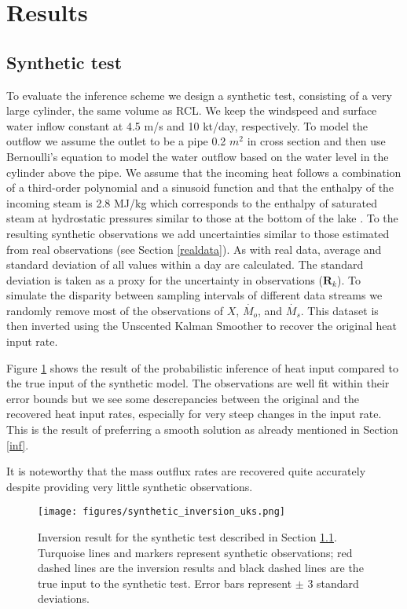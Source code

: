 \documentclass{bmcart}
\newcommand{\bm}[1]{{\textbf{#1}}}
\begin{document}
\section{Results}
\subsection{Synthetic test}\label{syn_test} 

To evaluate the inference scheme we design a synthetic test, consisting of a
very large cylinder, the same volume as RCL. We keep the windspeed and surface
water inflow constant at 4.5 m/s and 10 kt/day, respectively. To model the
outflow we assume the outlet to be a pipe 0.2 $m^2$ in cross section and then
use Bernoulli's equation to model the water outflow based on the water level in
the cylinder above the pipe. We assume that the incoming heat follows a
combination of a third-order polynomial and a sinusoid function and that the
enthalpy of the incoming steam is 2.8 MJ/kg which corresponds to the enthalpy of
saturated steam at hydrostatic pressures similar to those at the bottom of the
lake \cite{Mayhew1978}. To the resulting synthetic observations we add
uncertainties similar to those estimated from real observations (see Section
\ref{realdata}). As with real data, average and standard deviation of all values
within a day are calculated. The standard deviation is taken as a proxy for the
uncertainty in observations ($\bm{R}_k$). To simulate the disparity between sampling
intervals of different data streams we randomly remove most of the observations
of $X$, $\dot{M_o}$, and $\dot{M_s}$. This dataset is then inverted using the
Unscented Kalman Smoother to recover the original heat input rate. 

Figure \ref{syn_example} shows the result of the probabilistic inference of
heat input compared to the true input of the synthetic model. The observations
are well fit within their error bounds but we see some descrepancies between
the original and the recovered heat input rates, especially for very steep
changes in the input rate. This is the result of preferring a smooth solution
as already mentioned in Section \ref{inf}.

It is noteworthy that the mass outflux rates are recovered quite accurately
despite providing very little synthetic observations.

\begin{figure}
	\texttt{[image: figures/synthetic\_inversion\_uks.png]}  
    \caption{Inversion result for the synthetic test described in Section 
        \ref{syn_test}. Turquoise lines and markers represent synthetic 
        observations; red dashed lines are the inversion results and black
        dashed lines are the true input to the synthetic test. Error bars 
        represent $\pm$ 3 standard deviations.}
  \label{syn_example}
\end{figure}
\end{document}
